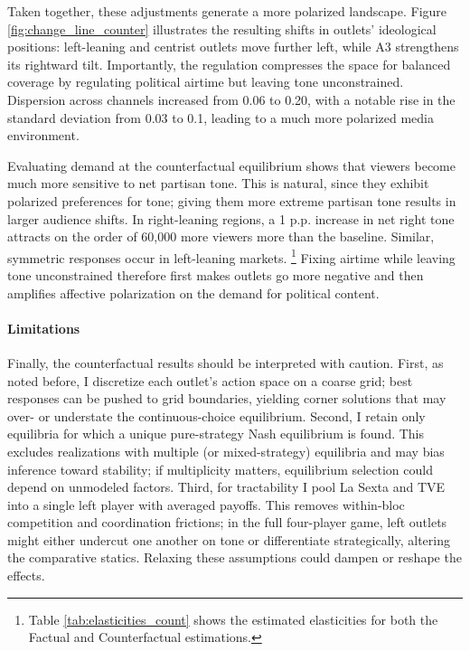 \documentclass[12pt]{article}
\begin{document}
	
	
	Taken together, these adjustments generate a  more polarized landscape. Figure \ref{fig:change_line_counter} illustrates the resulting shifts in outlets’ ideological positions: left-leaning and centrist outlets move further left, while A3 strengthens its rightward tilt. Importantly, the regulation compresses the space for balanced coverage by regulating political airtime but leaving tone unconstrained. Dispersion across channels increased from 0.06 to 0.20, with a notable rise in the standard deviation from 0.03 to 0.1, leading to a much more polarized media environment.
	
	
	Evaluating demand at the counterfactual equilibrium shows that viewers become much more sensitive to net partisan tone. This is natural, since they exhibit polarized preferences for tone; giving them more extreme partisan tone results in larger audience shifts. In right-leaning regions, a 1 p.p. increase in net right tone attracts on the order of 60,000 more viewers more than the baseline. Similar, symmetric responses occur in  left-leaning markets.  \footnote{Table \ref{tab:elasticities_count} shows the estimated elasticities for both the Factual and Counterfactual estimations. } Fixing airtime while leaving tone unconstrained therefore first makes outlets go more negative and then amplifies affective polarization on the demand for political content. 
	
	
	
	\paragraph{Limitations} Finally, the counterfactual results should be interpreted with caution. First, as noted before, I discretize each outlet’s action space on a coarse grid; best responses can be pushed to grid boundaries, yielding corner solutions that may over- or understate the continuous-choice equilibrium. Second, I retain only equilibria for which a unique pure-strategy Nash equilibrium is found. This excludes realizations with multiple (or mixed-strategy) equilibria and may bias inference toward stability; if multiplicity matters, equilibrium selection could depend on unmodeled factors. Third, for tractability I pool La Sexta and TVE into a single left player with averaged payoffs. This removes within-bloc competition and coordination frictions; in the full four-player game, left outlets might either undercut one another on tone or differentiate strategically, altering the comparative statics. Relaxing these assumptions could dampen or reshape the effects.
	
\end{document}
